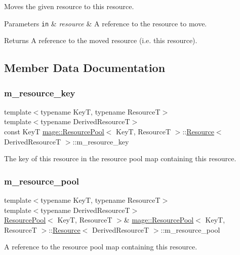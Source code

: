 Moves the given resource to this resource.


\begin{DoxyParams}[1]{Parameters}
\mbox{\tt in}  & {\em resource} & A reference to the resource to move. \\
\hline
\end{DoxyParams}
\begin{DoxyReturn}{Returns}
A reference to the moved resource (i.\+e. this resource). 
\end{DoxyReturn}


\subsection{Member Data Documentation}
\hypertarget{structmage_1_1_resource_pool_1_1_resource_a7980e0160d7b3ff4fc70ec4deabb443c}{}\label{structmage_1_1_resource_pool_1_1_resource_a7980e0160d7b3ff4fc70ec4deabb443c} 
\subsubsection{\texorpdfstring{m\+\_\+resource\+\_\+key}{m\_resource\_key}}
{\footnotesize\ttfamily template$<$typename KeyT, typename ResourceT$>$ \\
template$<$typename Derived\+ResourceT$>$ \\
const KeyT \hyperlink{classmage_1_1_resource_pool}{mage\+::\+Resource\+Pool}$<$ KeyT, ResourceT $>$\+::\hyperlink{structmage_1_1_resource_pool_1_1_resource}{Resource}$<$ Derived\+ResourceT $>$\+::m\+\_\+resource\+\_\+key\hspace{0.3cm}{\ttfamily [private]}}

The key of this resource in the resource pool map containing this resource. \hypertarget{structmage_1_1_resource_pool_1_1_resource_ab3810b406a481301673b74670b4cc92f}{}\label{structmage_1_1_resource_pool_1_1_resource_ab3810b406a481301673b74670b4cc92f} 
\subsubsection{\texorpdfstring{m\+\_\+resource\+\_\+pool}{m\_resource\_pool}}
{\footnotesize\ttfamily template$<$typename KeyT, typename ResourceT$>$ \\
template$<$typename Derived\+ResourceT$>$ \\
\hyperlink{classmage_1_1_resource_pool}{Resource\+Pool}$<$ KeyT, ResourceT $>$\& \hyperlink{classmage_1_1_resource_pool}{mage\+::\+Resource\+Pool}$<$ KeyT, ResourceT $>$\+::\hyperlink{structmage_1_1_resource_pool_1_1_resource}{Resource}$<$ Derived\+ResourceT $>$\+::m\+\_\+resource\+\_\+pool\hspace{0.3cm}{\ttfamily [private]}}

A reference to the resource pool map containing this resource. 
